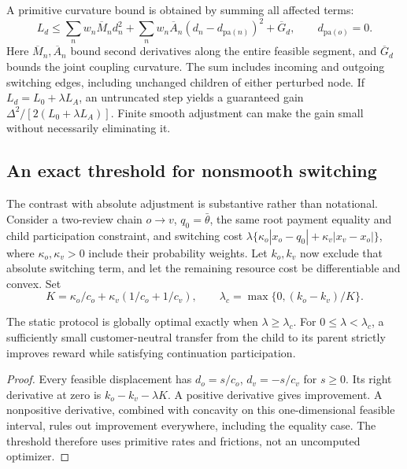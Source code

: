 A primitive curvature bound is obtained by summing all affected terms:
\begin{equation}\label{eq:r10-curvature}
 L_d\leq\sum_n w_n\overline M_n d_n^2+
 \sum_n w_n\overline A_n(d_n-d_{\mathrm{pa}(n)})^2+\overline G_d,
 \qquad d_{\mathrm{pa}(o)}=0.
\end{equation}
Here $\overline M_n,\overline A_n$ bound second derivatives along the entire feasible segment, and $\overline G_d$ bounds the joint coupling curvature. The sum includes incoming and outgoing switching edges, including unchanged children of either perturbed node. If $L_d=L_0+\lambda L_A$, an untruncated step yields a guaranteed gain $\Delta^2/[2(L_0+\lambda L_A)]$. Finite smooth adjustment can make the gain small without necessarily eliminating it.

\subsection{An exact threshold for nonsmooth switching}
The contrast with absolute adjustment is substantive rather than notational. Consider a two-review chain $o\to v$, $q_0=\bar\theta$, the same root payment equality and child participation constraint, and switching cost
$\lambda\{\kappa_o|x_o-q_0|+\kappa_v|x_v-x_o|\}$, where $\kappa_o,\kappa_v>0$ include their probability weights. Let $k_o,k_v$ now exclude that absolute switching term, and let the remaining resource cost be differentiable and convex. Set
\[
 K=\kappa_o/c_o+\kappa_v(1/c_o+1/c_v),\qquad
 \lambda_c=\max\{0,(k_o-k_v)/K\}.
\]
\begin{corollary}\label{cor:r10-threshold}
The static protocol is globally optimal exactly when $\lambda\geq\lambda_c$. For $0\leq\lambda<\lambda_c$, a sufficiently small customer-neutral transfer from the child to its parent strictly improves reward while satisfying continuation participation.
\end{corollary}
\begin{proof}
Every feasible displacement has $d_o=s/c_o$, $d_v=-s/c_v$ for $s\geq0$. Its right derivative at zero is $k_o-k_v-\lambda K$. A positive derivative gives improvement. A nonpositive derivative, combined with concavity on this one-dimensional feasible interval, rules out improvement everywhere, including the equality case. The threshold therefore uses primitive rates and frictions, not an uncomputed optimizer.
\end{proof}

